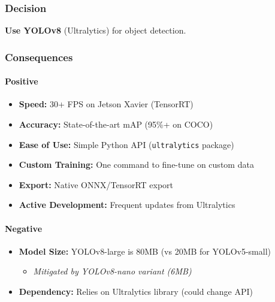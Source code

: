 \documentclass[
]{article}
\providecommand{\tightlist}{%
  \setlength{\itemsep}{0pt}\setlength{\parskip}{0pt}}
\begin{document}
\hypertarget{decision-7}{%
\subsubsection{Decision}\label{decision-7}}

\textbf{Use YOLOv8} (Ultralytics) for object detection.

\hypertarget{consequences-7}{%
\subsubsection{Consequences}\label{consequences-7}}

\hypertarget{positive-7}{%
\paragraph{Positive}\label{positive-7}}

\begin{itemize}
\tightlist
\item
  \textbf{Speed:} 30+ FPS on Jetson Xavier (TensorRT)
\item
  \textbf{Accuracy:} State-of-the-art mAP (95\%+ on COCO)
\item
  \textbf{Ease of Use:} Simple Python API (\texttt{ultralytics} package)
\item
  \textbf{Custom Training:} One command to fine-tune on custom data
\item
  \textbf{Export:} Native ONNX/TensorRT export
\item
  \textbf{Active Development:} Frequent updates from Ultralytics
\end{itemize}

\hypertarget{negative-7}{%
\paragraph{Negative}\label{negative-7}}

\begin{itemize}
\tightlist
\item
  \textbf{Model Size:} YOLOv8-large is 80MB (vs 20MB for YOLOv5-small)

  \begin{itemize}
  \tightlist
  \item
    \emph{Mitigated by YOLOv8-nano variant (6MB)}
  \end{itemize}
\item
  \textbf{Dependency:} Relies on Ultralytics library (could change API)
\end{itemize}
\end{document}
